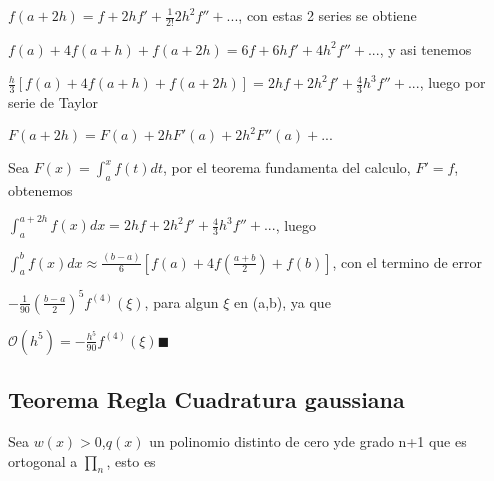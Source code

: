 \documentclass{article}
\begin{document}
\vspace{5mm}

$f(a+2h) = f + 2hf' + \displaystyle\frac{1}{2!}2h^2f''+...$, con estas 2 series se obtiene

\vspace{5mm}

$f(a)+4f(a+h)+f(a+2h)=6f+6hf'+4h^2f''+...$, y asi tenemos

\vspace{5mm}

$\displaystyle\frac{h}{3}[f(a)+4f(a+h)+f(a+2h)]=2hf+2h^2f'+\displaystyle\frac{4}{3}h^3f''+...$, luego por serie de Taylor

\vspace{5mm}

$F(a+2h) = F(a)+2hF'(a)+2h^2F''(a)+...$

\vspace{5mm}

Sea $F(x) = \displaystyle\int_{a}^{x}f(t)dt$, por el teorema fundamenta del calculo, $F'=f$, obtenemos

\vspace{5mm}

$\displaystyle\int_{a}^{a+2h}f(x)dx=2hf+2h^2f'+\displaystyle\frac{4}{3}h^3f''+...$, luego

\vspace{5mm}

$\displaystyle\int_{a}^{b}f(x)dx \approx \displaystyle\frac{(b-a)}{6}\left[f(a)+4f\left(\displaystyle\frac{a+b}{2} \right)+f(b) \right]$, con el termino de error

\vspace{5mm}

$-\displaystyle\frac{1}{90} \left( \displaystyle\frac{b-a}{2} \right)^5 f^{(4)}(\xi)$, para algun $\xi$ en (a,b), ya que

\vspace{5mm}

$\mathcal{O}(h^5) = - \displaystyle\frac{h^5}{90}f^{(4)}(\xi)$$\blacksquare$




\vspace{10mm}

\subsection{Teorema Regla Cuadratura gaussiana}\label{T.-Auxiliar-Cuadratura-gaussiana}

Sea $w(x)>0$,$q(x)$ un polinomio distinto de cero yde grado n+1 que es ortogonal a $\prod_{n}$, esto es
\end{document}
